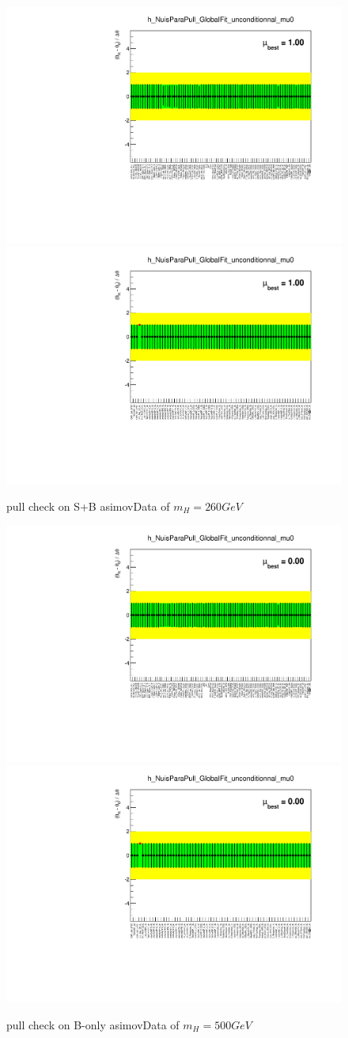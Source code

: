 \begin{figure}
\includegraphics[width=.4\textwidth, angle=-90]{fig/Statistical/combination/pull-exp-combined-mH260_1_mu1.pdf}
\includegraphics[width=.4\textwidth, angle=-90]{fig/Statistical/combination/pull-exp-combined-mH260_2_mu1.pdf}
\caption{pull check on S+B asimovData of $m_{H}=260 GeV$}
\label{fig:pull-exp-comb-260_mu1}
\end{figure}

\begin{figure}
\includegraphics[width=.4\textwidth, angle=-90]{fig/Statistical/combination/pull-exp-combined-mH500_1.pdf}
\includegraphics[width=.4\textwidth, angle=-90]{fig/Statistical/combination/pull-exp-combined-mH500_2.pdf}
\caption{pull check on B-only asimovData of $m_{H}=500 GeV$}
\label{fig:pull-exp-comb-500}
\end{figure}


